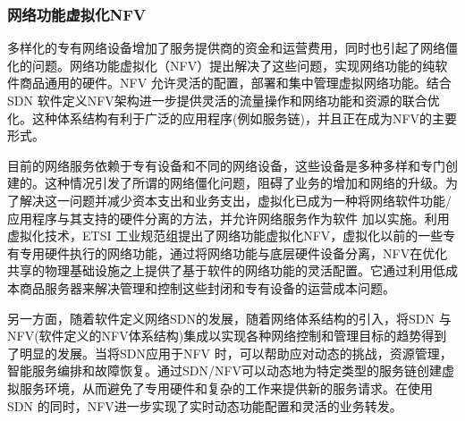 \subsubsection{网络功能虚拟化NFV}
多样化的专有网络设备增加了服务提供商的资金和运营费用，同时也引起了网络僵化的问题。网络功能虚拟化（NFV）提出解决了这些问题，实现网络功能的纯软件商品通用的硬件。NFV 允许灵活的配置，部署和集中管理虚拟网络功能。结合SDN 软件定义NFV架构进一步提供灵活的流量操作和网络功能和资源的联合优化。这种体系结构有利于广泛的应用程序(例如服务链)，并且正在成为NFV的主要形式。

目前的网络服务依赖于专有设备和不同的网络设备，这些设备是多种多样和专门创建的\cite{sherry2012making,wang2011untold,walfish2004middleboxes}。这种情况引发了所谓的网络僵化问题，阻碍了业务的增加和网络的升级。为了解决这一问题并减少资本支出和业务支出，虚拟化已成为一种将网络软件功能/应用程序与其支持的硬件分离的方法，并允许网络服务作为软件\cite{schaffrath2009network,chowdhury2010survey,chowdhury2009network} 加以实施。利用虚拟化技术，ETSI 工业规范组提出了网络功能虚拟化NFV，虚拟化以前的一些专有专用硬件执行的网络功能\cite{chiosi2012network,yue2013network}，通过将网络功能与底层硬件设备分离，NFV在优化共享的物理基础设施之上提供了基于软件的网络功能的灵活配置。它通过利用低成本商品服务器来解决管理和控制这些封闭和专有设备的运营成本问题。

另一方面，随着软件定义网络SDN的发展，随着网络体系结构\cite{manzalini2014software,yeganeh2013scalability,ge20145g}的引入，将SDN 与NFV(软件定义的NFV体系结构)集成以实现各种网络控制和管理目标的趋势得到了明显的发展。当将SDN应用于NFV 时，可以帮助应对动态的挑战，资源管理，智能服务编排和故障恢复。通过SDN/NFV可以动态地为特定类型的服务链创建虚拟服务环境，从而避免了专用硬件和复杂的工作来提供新的服务请求。在使用SDN 的同时，NFV进一步实现了实时动态功能配置和灵活的业务转发。






